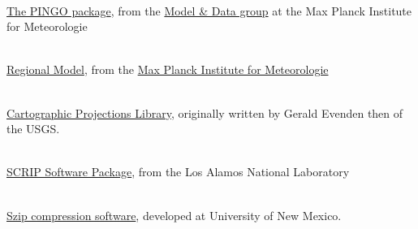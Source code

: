 \begin{thebibliography}{xx}
\label{PINGO}
 \ \\
  \href{http://www.mad.zmaw.de/Pingo/post/down/BigPingo.pdf}{The PINGO package},
  from the
  \href{http://www.mad.zmaw.de}{Model \& Data group}
  at the Max Planck Institute for Meteorologie

\label{REMO}
 \ \\
  \href{http://www.mpimet.mpg.de/en/wissenschaft/ueberblick/atmosphaere-im-erdsystem/regionale-klimamodellierung.html}
       {Regional Model},
  from the
  \href{http://www.mpimet.mpg.de}
       {Max Planck Institute for Meteorologie}

\label{PROJ.4}
 \ \\
  \href{http://trac.osgeo.org/proj/}{Cartographic Projections Library},
  originally written by Gerald Evenden then of the USGS.

\label{SCRIP}
 \ \\
  \href{http://climate.lanl.gov/Software/SCRIP}{SCRIP Software Package},
  from the Los Alamos National Laboratory

\label{szip}
 \ \\
  \href{http://hdf.ncsa.uiuc.edu/doc_resource/SZIP}{Szip compression software},
  developed at University of New Mexico.

\end{thebibliography}
